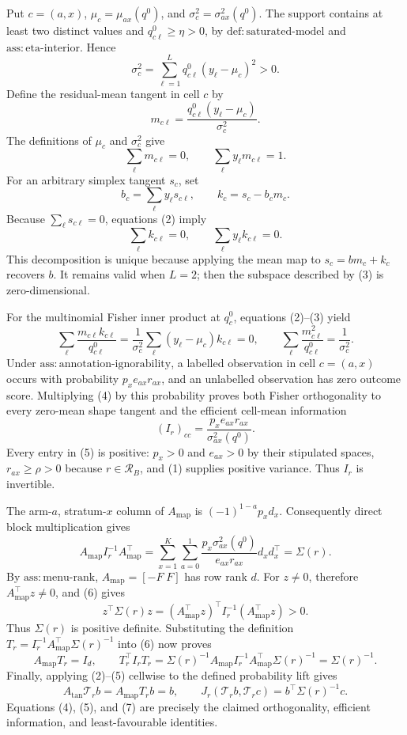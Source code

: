 Put \(c=(a,x)\), \(\mu_c=\mu_{ax}(q^0)\), and \(\sigma_c^2=\sigma^2_{ax}(q^0)\).  The support contains at least two distinct values and \(q^0_{c\ell}\geq\eta>0\), by \(\mathrm{def:saturated\text{-}model}\) and \(\mathrm{ass:eta\text{-}interior}\).  Hence
\[
 \sigma_c^2=\sum_{\ell=1}^Lq^0_{c\ell}(y_\ell-\mu_c)^2>0.
 \tag{1}
\]
Define the residual-mean tangent in cell \(c\) by
\[
 m_{c\ell}=\frac{q^0_{c\ell}(y_\ell-\mu_c)}{\sigma_c^2}.
\]
The definitions of \(\mu_c\) and \(\sigma_c^2\) give
\[
 \sum_\ell m_{c\ell}=0,\qquad
 \sum_\ell y_\ell m_{c\ell}=1.                                      \tag{2}
\]
For an arbitrary simplex tangent \(s_c\), set
\[
 b_c=\sum_\ell y_\ell s_{c\ell},\qquad k_c=s_c-b_cm_c.
\]
Because \(\sum_\ell s_{c\ell}=0\), equations (2) imply
\[
 \sum_\ell k_{c\ell}=0,\qquad \sum_\ell y_\ell k_{c\ell}=0.          \tag{3}
\]
This decomposition is unique because applying the mean map to \(s_c=bm_c+k_c\) recovers \(b\).  It remains valid when \(L=2\); then the subspace described by (3) is zero-dimensional.

For the multinomial Fisher inner product at \(q^0_c\), equations (2)--(3) yield
\[
 \sum_\ell\frac{m_{c\ell}k_{c\ell}}{q^0_{c\ell}}
 =\frac1{\sigma_c^2}\sum_\ell(y_\ell-\mu_c)k_{c\ell}=0,\qquad
 \sum_\ell\frac{m_{c\ell}^2}{q^0_{c\ell}}=\frac1{\sigma_c^2}.       \tag{4}
\]
Under \(\mathrm{ass:annotation\text{-}ignorability}\), a labelled observation in cell \(c=(a,x)\) occurs with probability \(p_xe_{ax}r_{ax}\), and an unlabelled observation has zero outcome score.  Multiplying (4) by this probability proves both Fisher orthogonality to every zero-mean shape tangent and the efficient cell-mean information
\[
 (I_r)_{cc}=\frac{p_xe_{ax}r_{ax}}{\sigma^2_{ax}(q^0)}.                \tag{5}
\]
Every entry in (5) is positive: \(p_x>0\) and \(e_{ax}>0\) by their stipulated spaces, \(r_{ax}\geq\rho>0\) because \(r\in\mathcal R_B\), and (1) supplies positive variance.  Thus \(I_r\) is invertible.

The arm-\(a\), stratum-\(x\) column of \(A_{\mathrm{map}}\) is \((-1)^{1-a}p_xd_x\).  Consequently direct block multiplication gives
\[
 A_{\mathrm{map}}I_r^{-1}A_{\mathrm{map}}^\top
 =\sum_{x=1}^K\sum_{a=0}^1
 \frac{p_x\sigma^2_{ax}(q^0)}{e_{ax}r_{ax}}d_xd_x^\top
 =\Sigma(r).                                                         \tag{6}
\]
By \(\mathrm{ass:menu\text{-}rank}\), \(A_{\mathrm{map}}=[-F\;F]\) has row rank \(d\).  For \(z\neq0\), therefore \(A_{\mathrm{map}}^\top z\neq0\), and (6) gives
\[
 z^\top\Sigma(r)z=(A_{\mathrm{map}}^\top z)^\top I_r^{-1}
 (A_{\mathrm{map}}^\top z)>0.
\]
Thus \(\Sigma(r)\) is positive definite.  Substituting the definition
\(T_r=I_r^{-1}A_{\mathrm{map}}^\top\Sigma(r)^{-1}\) into (6) now proves
\[
 A_{\mathrm{map}}T_r=I_d,\qquad
 T_r^\top I_rT_r
 =\Sigma(r)^{-1}A_{\mathrm{map}}I_r^{-1}A_{\mathrm{map}}^\top
   \Sigma(r)^{-1}
 =\Sigma(r)^{-1}.                                                     \tag{7}
\]
Finally, applying (2)--(5) cellwise to the defined probability lift gives
\[
 A_{\mathrm{tan}}\mathcal T_rb=A_{\mathrm{map}}T_rb=b,\qquad
 J_r(\mathcal T_rb,\mathcal T_rc)=b^\top\Sigma(r)^{-1}c.              \tag{8}
\]
Equations (4), (5), and (7) are precisely the claimed orthogonality, efficient information, and least-favourable identities.

